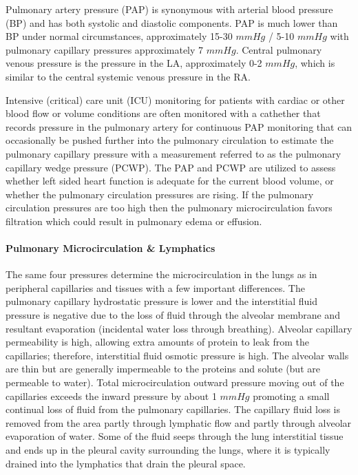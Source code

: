 Pulmonary artery pressure (PAP) is synonymous with arterial blood pressure (BP) and has both systolic and diastolic components. PAP is much lower than BP under normal circumstances, approximately 15-30 $mmHg$ / 5-10 $mmHg$ with pulmonary capillary pressures approximately 7 $mmHg$. Central pulmonary venous pressure is the pressure in the LA, approximately 0-2 $mmHg$, which is similar to the central systemic venous pressure in the RA. 

Intensive (critical) care unit (ICU) monitoring for patients with cardiac or other blood flow or volume conditions are often monitored with a cathether that records pressure in the pulmonary artery for continuous PAP monitoring that can occasionally be pushed further into the pulmonary circulation to estimate the pulmonary capillary pressure with a measurement referred to as the pulmonary capillary wedge pressure (PCWP). The PAP and PCWP are utilized to assess whether left sided heart function is adequate for the current blood volume, or whether the pulmonary circulation pressures are rising. If the pulmonary circulation pressures are too high then the pulmonary microcirculation favors filtration which could result in pulmonary edema or effusion.

\paragraph{Pulmonary Microcirculation \& Lymphatics}

The same four pressures determine the microcirculation in the lungs as in peripheral capillaries and tissues with a few important differences. The pulmonary capillary hydrostatic pressure is lower and the interstitial fluid pressure is negative due to the loss of fluid through the alveolar membrane and resultant evaporation (incidental water loss through breathing). Alveolar capillary permeability is high, allowing extra amounts of protein to leak from the capillaries; therefore, interstitial fluid osmotic pressure is high. The alveolar walls are thin but are generally impermeable to the proteins and solute (but are permeable to water). Total microcirculation outward pressure moving out of the capillaries exceeds the inward pressure by about 1 $mmHg$ promoting a small continual loss of fluid from the pulmonary capillaries. The capillary fluid loss is removed from the area partly through lymphatic flow and partly through alveolar evaporation of water. Some of the fluid seeps through the lung interstitial tissue and ends up in the pleural cavity surrounding the lungs, where it is typically drained into the lymphatics that drain the pleural space.

